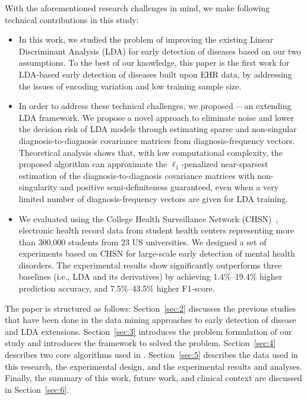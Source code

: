 %
With the aforementioned research challenges in mind, we make following technical contributions in this study:
%
\begin{itemize}
\item In this work, we studied the problem of improving the existing Linear Discriminant Analysis (LDA) for early detection of diseases based on our two assumptions.
To the best of our knowledge, this paper is the first work for LDA-based early detection of diseases built upon EHR data, by addressing the issues of encoding variation and low training sample size.


\item In order to address these technical challenges, we proposed \TheName{}---an extending LDA framework.
%
We propose a novel approach to eliminate noise and lower the decision risk of LDA models through estimating sparse and non-singular diagnosis-to-diagnosis covariance matrices from diagnosis-frequency vectors.
Theoretical analysis shows that, with low computational complexity, the proposed algorithm can approximate the $\ell_1$-penalized near-sparsest estimation of the diagnosis-to-diagnosis covariance matrices with non-singularity and positive semi-definiteness guaranteed, even when a very limited number of diagnosis-frequency vectors are given for LDA training.

\item We evaluated \TheName{} using the College Health Surveillance Network (CHSN)~\cite{turner_college_2015}, electronic health record data from student health centers representing more than 300,000 students from 23 US universities. We designed a set of experiments based on CHSN for large-scale early detection of mental health disorders. The experimental results show \TheName{} significantly outperforms three baselines (i.e., LDA and its derivatives) by achieving 1.4\%--19.4\% higher prediction accuracy, and 7.5\%--43.5\% higher F1-score.


\end{itemize}

The paper is structured as follows: Section~\ref{sec:2} discusses the previous studies that have been done in the data mining approaches to early detection of disease and LDA extensions.
Section~\ref{sec:3} introduces the problem formulation of our study and introduces the \TheName{} framework to solved the problem.
Section~\ref{sec:4} describes two core algorithms used in \TheName{}.
Section~\ref{sec:5} describes the data used in this research, the experimental design, and the experimental results and analyses.
Finally, the summary of this work, future work, and clinical context are discussed in Section~\ref{sec:6}.
 

